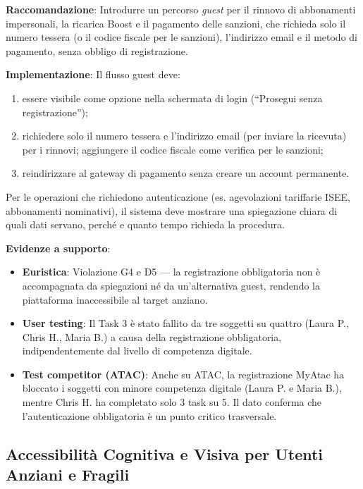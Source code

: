\documentclass[11pt,a4paper]{article}
\begin{document}
\textbf{Raccomandazione}: Introdurre un percorso \textit{guest} per il
rinnovo di abbonamenti impersonali, la ricarica Boost e il pagamento
delle sanzioni, che richieda solo il numero tessera (o il codice fiscale
per le sanzioni), l'indirizzo email e il metodo di pagamento, senza
obbligo di registrazione.

\textbf{Implementazione}: Il flusso guest deve:
\begin{enumerate}
    \item essere visibile come opzione nella schermata di login
    (``Prosegui senza registrazione'');
    \item richiedere solo il numero tessera e l'indirizzo email (per
    inviare la ricevuta) per i rinnovi; aggiungere il codice fiscale
    come verifica per le sanzioni;
    \item reindirizzare al gateway di pagamento senza creare un account
    permanente.
\end{enumerate}
Per le operazioni che richiedono autenticazione (es. agevolazioni
tariffarie ISEE, abbonamenti nominativi), il sistema deve mostrare
una spiegazione chiara di quali dati servano, perché e quanto tempo
richieda la procedura.

\textbf{Evidenze a supporto}:
\begin{itemize}
    \item \textbf{Euristica}: Violazione G4 e D5 --- la registrazione
    obbligatoria non è accompagnata da spiegazioni né da un'alternativa
    guest, rendendo la piattaforma inaccessibile al target anziano.
    \item \textbf{User testing}: Il Task 3 \`e stato fallito da tre
    soggetti su quattro (Laura P., Chris H., Maria B.) a causa della
    registrazione obbligatoria, indipendentemente dal livello di
    competenza digitale.
    \item \textbf{Test competitor (ATAC)}: Anche su ATAC, la
    registrazione MyAtac ha bloccato i soggetti con minore competenza
    digitale (Laura P. e Maria B.), mentre Chris H. ha completato solo
    3 task su 5. Il dato conferma che l'autenticazione obbligatoria
    \`e un punto critico trasversale.
\end{itemize}




\subsection{Accessibilit\`a Cognitiva e Visiva per Utenti Anziani e Fragili}
\end{document}

